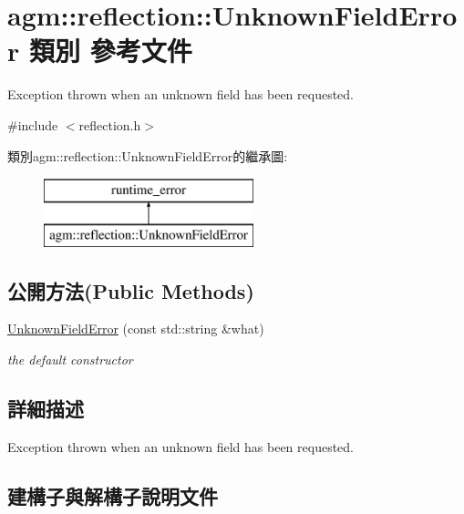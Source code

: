 \hypertarget{classagm_1_1reflection_1_1_unknown_field_error}{}\section{agm\+:\+:reflection\+:\+:Unknown\+Field\+Error 類別 參考文件}
\label{classagm_1_1reflection_1_1_unknown_field_error}


Exception thrown when an unknown field has been requested.  




{\ttfamily \#include $<$reflection.\+h$>$}

類別agm\+:\+:reflection\+:\+:Unknown\+Field\+Error的繼承圖\+:\begin{figure}[H]
\begin{center}
\leavevmode
\includegraphics[height=2.000000cm]{classagm_1_1reflection_1_1_unknown_field_error}
\end{center}
\end{figure}
\subsection*{公開方法(Public Methods)}
\begin{DoxyCompactItemize}
\item 
\hyperlink{classagm_1_1reflection_1_1_unknown_field_error_a1ed4cfef1089bf0177b68dfebc6c8e20}{Unknown\+Field\+Error} (const std\+::string \&what)
\begin{DoxyCompactList}\small\item\em the default constructor \end{DoxyCompactList}\end{DoxyCompactItemize}


\subsection{詳細描述}
Exception thrown when an unknown field has been requested. 

\subsection{建構子與解構子說明文件}
